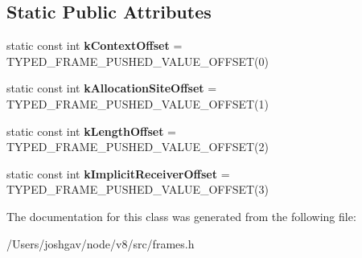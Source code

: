 \subsection*{Static Public Attributes}
\begin{DoxyCompactItemize}
\item 
static const int {\bfseries k\+Context\+Offset} = T\+Y\+P\+E\+D\+\_\+\+F\+R\+A\+M\+E\+\_\+\+P\+U\+S\+H\+E\+D\+\_\+\+V\+A\+L\+U\+E\+\_\+\+O\+F\+F\+S\+ET(0)\hypertarget{classv8_1_1internal_1_1_construct_frame_constants_a6308141a988d642ac3451ee826cac03c}{}\label{classv8_1_1internal_1_1_construct_frame_constants_a6308141a988d642ac3451ee826cac03c}

\item 
static const int {\bfseries k\+Allocation\+Site\+Offset} = T\+Y\+P\+E\+D\+\_\+\+F\+R\+A\+M\+E\+\_\+\+P\+U\+S\+H\+E\+D\+\_\+\+V\+A\+L\+U\+E\+\_\+\+O\+F\+F\+S\+ET(1)\hypertarget{classv8_1_1internal_1_1_construct_frame_constants_a0460cdcafb88b2225c253b64fcefe6e3}{}\label{classv8_1_1internal_1_1_construct_frame_constants_a0460cdcafb88b2225c253b64fcefe6e3}

\item 
static const int {\bfseries k\+Length\+Offset} = T\+Y\+P\+E\+D\+\_\+\+F\+R\+A\+M\+E\+\_\+\+P\+U\+S\+H\+E\+D\+\_\+\+V\+A\+L\+U\+E\+\_\+\+O\+F\+F\+S\+ET(2)\hypertarget{classv8_1_1internal_1_1_construct_frame_constants_a5a80cdf37869ccb209dc226f9650e1c3}{}\label{classv8_1_1internal_1_1_construct_frame_constants_a5a80cdf37869ccb209dc226f9650e1c3}

\item 
static const int {\bfseries k\+Implicit\+Receiver\+Offset} = T\+Y\+P\+E\+D\+\_\+\+F\+R\+A\+M\+E\+\_\+\+P\+U\+S\+H\+E\+D\+\_\+\+V\+A\+L\+U\+E\+\_\+\+O\+F\+F\+S\+ET(3)\hypertarget{classv8_1_1internal_1_1_construct_frame_constants_a33f29533024049ebfed471a024c08a4d}{}\label{classv8_1_1internal_1_1_construct_frame_constants_a33f29533024049ebfed471a024c08a4d}

\end{DoxyCompactItemize}


The documentation for this class was generated from the following file\+:\begin{DoxyCompactItemize}
\item 
/\+Users/joshgav/node/v8/src/frames.\+h\end{DoxyCompactItemize}
